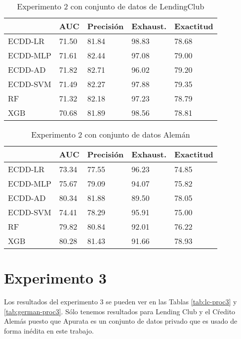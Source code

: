 \begin{table}[]
\centering
\caption{Experimento 2 con conjunto de datos de LendingClub}
\label{tab:lc-proc2}
\begin{tabularx}{0.75\textwidth}{|l|Y Y Y Y|}
				\hline
				& AUC		& Precisión	& Exhaust.		& Exactitud	\\
				\hline
ECDD-LR			& 71.50		& 81.84		& 98.83			& 78.68		\\		%
ECDD-MLP		& 71.61		& 82.44		& 97.08			& 79.00		\\		%
ECDD-AD			& 71.82		& 82.71		& 96.02			& 79.20		\\		%
ECDD-SVM		& 71.49		& 82.27		& 97.88			& 79.35		\\		%
				\hline
RF				& 71.32		& 82.18		& 97.23			& 78.79		\\		%
XGB				& 70.68		& 81.89		& 98.56			& 78.81		\\		%
				\hline
\end{tabularx}
\end{table}


\begin{table}[]
\centering
\caption{Experimento 2 con conjunto de datos Alemán}
\label{tab:german-proc2}
\begin{tabularx}{0.75\textwidth}{|l|Y Y Y Y|}
				\hline
				& AUC		& Precisión	& Exhaust.		& Exactitud	\\
				\hline
ECDD-LR			& 73.34		& 77.55		& 96.23			& 74.85		\\		%
ECDD-MLP		& 75.67		& 79.09		& 94.07			& 75.82		\\		%
ECDD-AD			& 80.34		& 81.88		& 89.50			& 78.05		\\		%
ECDD-SVM		& 74.41		& 78.29		& 95.91			& 75.00		\\		%
				\hline
RF				& 79.82		& 80.84		& 92.01			& 76.22		\\		%
XGB				& 80.28		& 81.43		& 91.66			& 78.93		\\		%
				\hline
\end{tabularx}
\end{table}


\section{Experimento 3} %

Los resultados del experimento 3 se pueden ver en las Tablas \ref{tab:lc-proc3} y \ref{tab:german-proc3}. Sólo tenemos resultados para Lending Club y el Cŕedito Alemás puesto que Apurata es un conjunto de datos privado que es usado de forma inédita en este trabajo.

